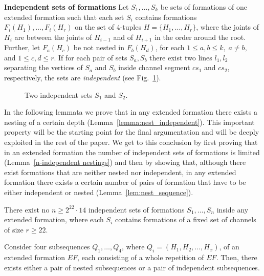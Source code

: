 \documentclass[a4paper,10pt]{llncs}
\newcounter{prop}
\begin{document}
{\bf Independent sets of formations}
Let $S_1, \ldots , S_k$ be sets of formations of one extended formation such that each set $S_i$ contains formations $F_i(H_1), \ldots, F_i(H_r)$ on the set of $4$-tuples $H=\{H_1, \ldots, H_r\}$, where the joints of $H_i$ are between the joints of $H_{i-1}$ and of $H_{i+1}$ in the order around the root. Further, let $F_a(H_c)$ be not nested in $F_b(H_d)$, for each $1\leq a,b \leq k, \; a \neq b,$ and $1\leq c,d \leq r$. If for each pair of sets $S_a,S_b$ there exist two lines $l_1,l_2$ separating the vertices of $S_a$ and $S_b$ inside channel segment $cs_1$ and $cs_2$, respectively, the sets are \emph{independent} (see Fig.~\ref{fig:independent}).

\begin{figure}[htb]
\caption{Two independent sets $S_1$ and $S_2$.}
  \label{fig:independent}
\end{figure}

In the following lemmata we prove that in any extended formation there exists a nesting of a certain depth (Lemma~\ref{lemma:nest_independent}). This important property will be the starting point for the final argumentation and will be deeply exploited in the rest of the paper. We get to this conclusion by first proving that in an extended formation the number of independent sets of formations is limited (Lemma~\ref{n-independent nestings}) and then by showing that, although there exist formations that are neither nested nor independent, in any extended formation there exists a certain number of pairs of formation that have to be either independent or nested (Lemma~\ref{lem:nest_sequence}).

\begin{lemma}\label{n-independent nestings}
There exist no $n\geq 2^{22}\cdot 14$ independent sets of formations $S_1,\ldots ,S_n$ inside any extended formation,
where each $S_i$ contains formations of a fixed set of channels of size $r\geq 22$.
\end{lemma}

\begin{lemma}\label{lem:nest_sequence}
Consider four subsequences $Q_1,\ldots ,Q_4$, where $Q_i = (H_1,H_2,\ldots,H_x)$, of an extended formation $EF$, each consisting of a whole repetition of $EF$. Then, there exists either a pair of nested subsequences or a pair of independent subsequences.
\end{lemma}
\end{document}
